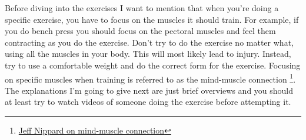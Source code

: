 \documentclass[openany, 12pt]{book}
\begin{document}
        Before diving into the exercises I want to mention that when you're doing a specific exercise, you have to focus on the muscles it should train. For example, if you do bench press
        you should focus on the pectoral muscles and feel them contracting as you do the exercise. Don't try to do the exercise no matter what, using all the muscles in
        your body. This will most likely lead to injury. Instead, try to use a comfortable weight and do the correct form for the exercise.
        Focusing on specific muscles when training is referred to as the mind-muscle connection
        \footnote{\href{https://www.youtube.com/watch?v=Ip25pzb-wdU}{Jeff Nippard on mind-muscle connection}}. The explanations I'm going to give next are just
        brief overviews and you should at least try to watch videos of someone doing the exercise before attempting it.
\end{document}
